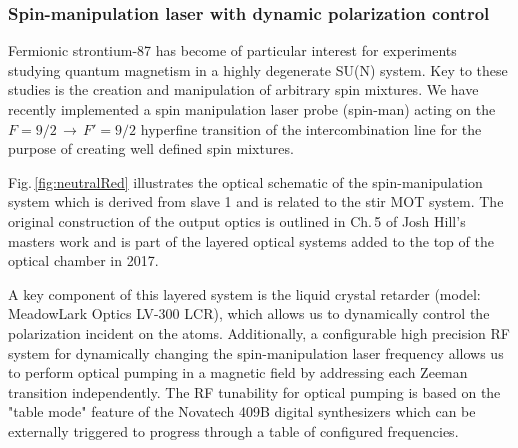 \subsubsection{Spin-manipulation laser with dynamic polarization control}
Fermionic strontium-87 has become of particular interest for experiments studying quantum magnetism in a highly degenerate SU(N) system.
Key to these studies is the creation and manipulation of arbitrary spin mixtures.
We have recently implemented a spin manipulation laser probe (spin-man) acting on the $F=9/2\,\rightarrow\,F'=9/2$ hyperfine transition of the intercombination line for the purpose of creating well defined spin mixtures.

Fig.\,\ref{fig:neutralRed} illustrates the optical schematic of the spin-manipulation system which is derived from slave 1 and is related to the stir MOT system.
The original construction of the output optics is outlined in Ch.\,5 of Josh Hill's masters work \cite{Hill2017} and is part of the layered optical systems added to the top of the optical chamber in 2017.

A key component of this layered system is the liquid crystal retarder (model: MeadowLark Optics LV-300 LCR), which allows us to dynamically control the polarization incident on the atoms.
Additionally, a configurable high precision RF system for dynamically changing the spin-manipulation laser frequency allows us to perform optical pumping in a magnetic field by addressing each Zeeman transition independently.
The RF tunability for optical pumping is based on the "table mode" feature of the Novatech 409B digital synthesizers which can be externally triggered to progress through a table of configured frequencies.

